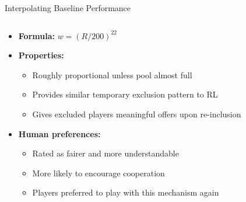 \documentclass[aspectratio=169]{beamer} %
\begin{document}
\begin{frame}{Interpolating Baseline Performance}
\begin{columns}
\begin{column}{0.55\textwidth}
\begin{itemize}
    \item \textbf{Formula:} $w = (R/200)^{22}$
    \item \textbf{Properties:}
    \begin{itemize}
        \item Roughly proportional unless pool almost full
        \item Provides similar temporary exclusion pattern to RL
        \item Gives excluded players meaningful offers upon re-inclusion
    \end{itemize}
    \item \textbf{Human preferences:}
    \begin{itemize}
        \item Rated as fairer and more understandable
        \item More likely to encourage cooperation
        \item Players preferred to play with this mechanism again
    \end{itemize}
\end{itemize}
\end{column}
\begin{column}{0.45\textwidth}
\end{column}
\end{columns}
\end{frame}
\end{document}
